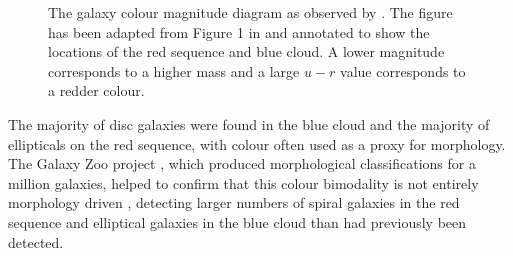 \begin{figure}[t]
\caption[Galaxy Colour Magnitude Diagram from \cite{Baldry04}]{The galaxy colour magnitude diagram as observed by \cite{Baldry04}. The figure has been adapted from Figure 1 in \citeauthor{Baldry04} and annotated to show the locations of the red sequence and blue cloud. A lower magnitude corresponds to a higher mass and a large $u-r$ value corresponds to a redder colour.}
\label{fig:cmdbaldry}
\end{figure}


The majority of disc galaxies were found in the blue cloud and the majority of ellipticals on the red sequence, with colour often used as a proxy for morphology. The Galaxy Zoo project \citep{lintott08, Lintott11}, which produced morphological classifications for a million galaxies, helped to confirm that this colour bimodality is not entirely morphology driven \citep{Strat01, Salim07, Sch07, CHV08, Bamford09, Skibba09}, detecting larger numbers of spiral galaxies in the red sequence \citep{masters10c} and elliptical galaxies in the blue cloud \citep{Sch09} than had previously been detected.

